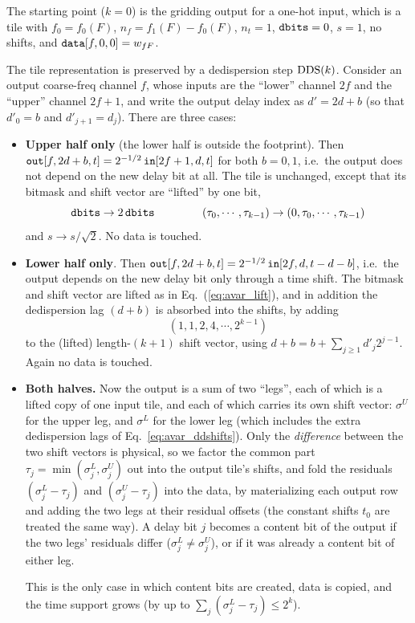 \documentclass{article}
\numberwithin{equation}{section}   %
\def\DDS{{\rm DDS}}
\begin{document}
The starting point ($k=0$) is the gridding output for a one-hot input, which is a tile with
$f_0 = f_0(F)$, $n_f = f_1(F) - f_0(F)$, $n_t = 1$, ${\tt dbits} = 0$, $s=1$, no shifts, and
${\tt data}[f,0,0] = w_{fF}$.

The tile representation is preserved by a dedispersion step $\DDS(k)$. Consider an output
coarse-freq channel $f$, whose inputs are the ``lower'' channel $2f$ and the ``upper'' channel
$2f+1$, and write the output delay index as $d' = 2d+b$ (so that $d'_0 = b$ and $d'_{j+1} = d_j$).
There are three cases:
\begin{itemize}

\item {\bf Upper half only} (the lower half is outside the footprint).
Then ${\tt out}[f,2d+b,t] = 2^{-1/2} \, {\tt in}[2f+1,d,t]$ for both $b=0,1$, i.e.\ the output does
not depend on the new delay bit at all. The tile is unchanged, except that its bitmask and shift
vector are ``lifted'' by one bit,
\begin{equation}
{\tt dbits} \rightarrow 2 \, {\tt dbits}
  \hspace{1.5cm}
(\tau_0, \cdots, \tau_{k-1}) \rightarrow (0, \tau_0, \cdots, \tau_{k-1})
  \label{eq:avar_lift}
\end{equation}
and $s \rightarrow s/\sqrt{2}$. No data is touched.

\item {\bf Lower half only}. Then ${\tt out}[f,2d+b,t] = 2^{-1/2} \, {\tt in}[2f,d,t-d-b]$, i.e.\ the
output depends on the new delay bit only through a time shift. The bitmask and shift vector are
lifted as in Eq.\ (\ref{eq:avar_lift}), and in addition the dedispersion lag $(d+b)$ is absorbed
into the shifts, by adding
\begin{equation}
(1, 1, 2, 4, \cdots, 2^{k-1})
  \label{eq:avar_ddshifts}
\end{equation}
to the (lifted) length-$(k+1)$ shift vector, using $d + b = b + \sum_{j \ge 1} d'_j 2^{j-1}$.
Again no data is touched.

\item {\bf Both halves.} Now the output is a sum of two ``legs'', each of which is a lifted copy of
one input tile, and each of which carries its own shift vector: $\sigma^U$ for the upper leg, and
$\sigma^L$ for the lower leg (which includes the extra dedispersion lags of
Eq.\ \ref{eq:avar_ddshifts}). Only the {\em difference} between the two shift vectors is physical,
so we factor the common part $\tau_j = \min(\sigma^L_j, \sigma^U_j)$ out into the output tile's
shifts, and fold the residuals $(\sigma^L_j - \tau_j)$ and $(\sigma^U_j - \tau_j)$ into the data,
by materializing each output row and adding the two legs at their residual offsets (the constant
shifts $t_0$ are treated the same way). A delay bit $j$ becomes a content bit of the output if the
two legs' residuals differ ($\sigma^L_j \ne \sigma^U_j$), or if it was already a content bit of
either leg.

This is the only case in which content bits are created, data is copied, and the time support
grows (by up to $\sum_j (\sigma^L_j - \tau_j) \le 2^k$).

\end{itemize}
\end{document}
